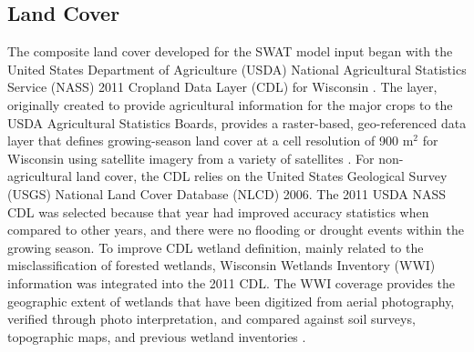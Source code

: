 \subsection{Land Cover}\label{sec:land_cover}
The composite land cover developed for the SWAT model input began with the
United States Department of Agriculture (USDA) National Agricultural Statistics
Service (NASS) 2011 Cropland Data Layer (CDL) for Wisconsin
. The layer, originally created to provide
agricultural information for the major crops to the USDA Agricultural Statistics
Boards, provides a raster-based, geo-referenced data layer that defines
growing-season land cover at a cell resolution of 900 m$^2$ for Wisconsin using
satellite imagery from a variety of satellites . For
non-agricultural land cover, the CDL relies on the United States Geological
Survey (USGS) National Land Cover Database (NLCD) 2006. The 2011 USDA NASS CDL
was selected because that year had improved accuracy statistics when compared to
other years, and there were no flooding or drought events within the growing
season. To improve CDL wetland definition, mainly related to the
misclassification of forested wetlands, Wisconsin Wetlands Inventory (WWI)
information was integrated into the 2011 CDL. The WWI coverage provides the
geographic extent of wetlands that have been digitized from aerial photography,
verified through photo interpretation, and compared against soil surveys,
topographic maps, and previous wetland inventories
.

